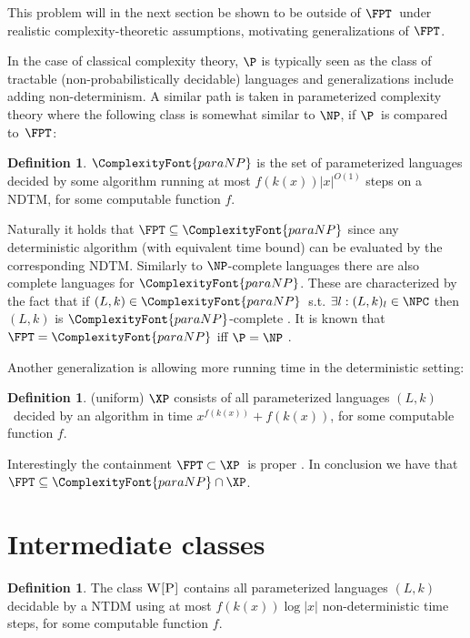 \documentclass[a4paper,11pt]{report}
\theoremstyle{plain}
\theoremstyle{definition}
\newtheorem{defn}[thm]{Definition} %
\newcommand{\PARANP}{\ComplexityFont{paraNP}}
\begin{document}
This problem will in the next section be shown to be outside of $\FPT$ under realistic complexity-theoretic assumptions, motivating generalizations of $\FPT$.

In the case of classical complexity theory, $\P$ is typically seen as the class of tractable (non-probabilistically decidable) languages and generalizations include adding non-determinism.
A similar path is taken in parameterized complexity theory where the following class is somewhat similar to $\NP$, if $\P$ is compared to $\FPT$:

\begin{defn}
$\PARANP$ is the set of parameterized languages decided by some algorithm running at most $f(k(x)) |x|^{O(1)}$ steps on a NDTM, for some computable function $f$.
\end{defn}

Naturally it holds that $\FPT \subseteq \PARANP$ since any deterministic algorithm (with equivalent time bound) can be evaluated by the corresponding NDTM.
Similarly to $\NP$-complete languages there are also complete languages for $\PARANP$.
These are characterized by the fact that if $(L, k) \in \PARANP$ s.t. $\exists l : (L, k)_l \in \NPC$ then $(L, k)$ is $\PARANP$-complete \cite{FG06}.
It is known that $\FPT = \PARANP$ iff $\P = \NP$ \cite{FG06}.

Another generalization is allowing more running time in the deterministic setting:

\begin{defn}
(uniform) $\XP$ consists of all parameterized languages $(L, k)$ decided by an algorithm in time
$x^{f(k(x))} + f(k(x))$, for some computable function $f$.
\end{defn}


Interestingly the containment $\FPT \subset \XP$ is proper \cite{FG06}.
In conclusion we have that $\FPT \subseteq \PARANP \cap \XP$.

\section{Intermediate classes}

\begin{defn}
The class $\textsc{W[P]}$ contains all parameterized languages $(L, k)$ decidable by a NTDM using at most $f(k(x)) \log |x| $ non-deterministic time steps, for some computable function $f$.
\end{defn}
\end{document}
